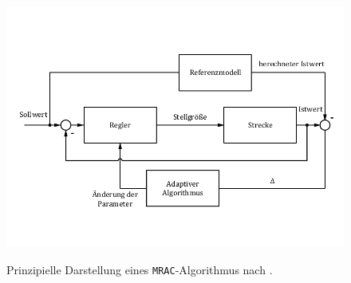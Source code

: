 \documentclass[conference,twocolumn]{IEEEtran}
\begin{document}
\begin{figure}
\includegraphics[width=\columnwidth]{img/mrac}
\label{fig:mrac}
\caption{Prinzipielle Darstellung eines \texttt{MRAC}-Algorithmus nach \textcite{slotine_applied_1991}.}
\end{figure}
\end{document}
